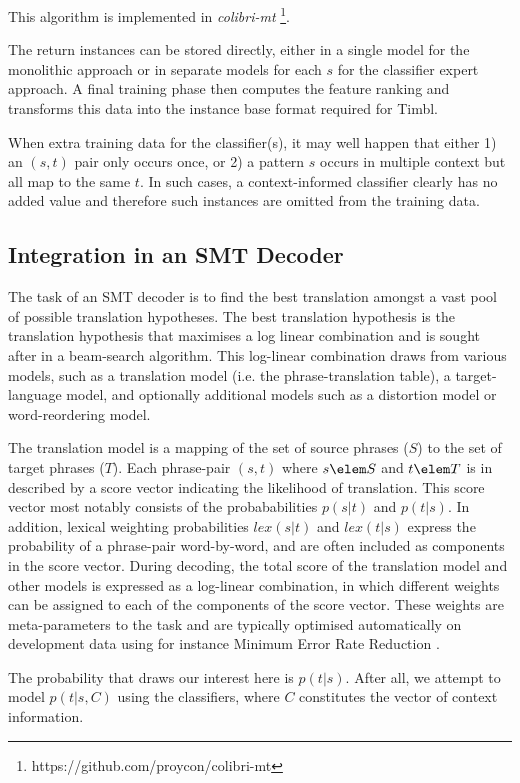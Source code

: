 \documentclass[11pt]{article}
\begin{document}
This algorithm is implemented in \emph{colibri-mt}
\footnote{https://github.com/proycon/colibri-mt}.

The return instances can be stored directly, either in a single model for the
monolithic approach or in separate models for each $s$ for the classifier
expert approach. A final training phase then computes the feature ranking and
transforms this data into the instance base format required for Timbl.

When extra training data for the classifier(s), it may well happen that either
1) an $(s,t)$ pair only occurs once, or 2) a pattern $s$ occurs in multiple
context but all map to the same $t$. In such cases, a context-informed
classifier clearly has no added value and therefore such instances are omitted from the training data.  

\subsection{Integration in an SMT Decoder}

The task of an SMT decoder is to find the best translation amongst a vast pool
of possible translation hypotheses. The best translation hypothesis is the
translation hypothesis that maximises a log linear combination and is sought
after in a beam-search algorithm. This log-linear combination draws from
various models, such as a translation model (i.e. the phrase-translation
table), a target-language model, and optionally additional models such as a
distortion model or word-reordering model.

The translation model is a mapping of the set of source phrases ($S$) to the
set of target phrases ($T$). Each phrase-pair $(s,t)$ where $s \elem S$ and $t
\elem T$ is in described by a score vector indicating the likelihood of
translation. This score vector most notably consists of the probababilities
$p(s|t)$ and $p(t|s)$. In addition, lexical weighting probabilities $lex(s|t)$
and $lex(t|s)$ express the probability of a phrase-pair word-by-word, and are
often included as components in the score vector. During decoding, the total
score of the translation model and other models is expressed as a log-linear
combination, in which different weights can be assigned to each of the
components of the score vector. These weights are meta-parameters to the task and
are typically optimised automatically on development data using for instance
Minimum Error Rate Reduction \cite{MERT}.

The probability that draws our interest here is $p(t|s)$. After all, we attempt
to model $p(t|s,C)$ using the classifiers, where $C$ constitutes the vector of context information.
\end{document}
